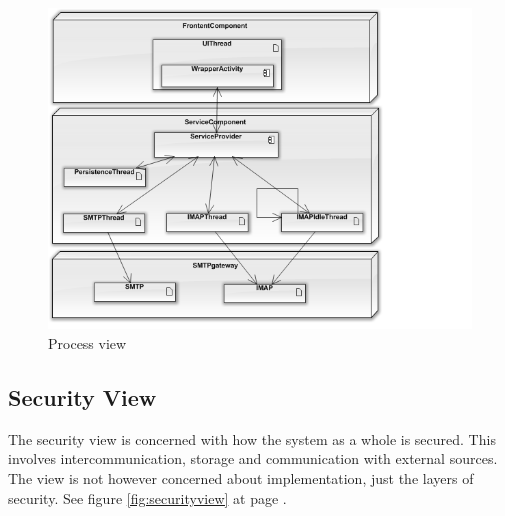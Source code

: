 \begin{figure}
	\includegraphics[width=\textwidth]{processview.png}
	\caption{Process view}
	\label{fig:processview}
\end{figure}

\subsection{Security View}
The security view is concerned with how the system as a whole is secured. This involves intercommunication, storage and communication with external sources. The view is not however concerned about implementation, just the layers of security.
See figure \ref{fig:securityview} at page \pageref{fig:securityview}.

